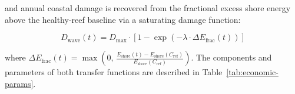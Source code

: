 \documentclass[10pt,letterpaper]{article}
\begin{document}
\noindent and annual coastal damage is recovered from the fractional excess shore energy above the healthy-reef baseline via a saturating damage function:

\begin{equation}
D_{\text{wave}}(t) = D_{\max} \cdot \left[1 - \exp\!\left(-\lambda \cdot \Delta E_{\text{frac}}(t)\right)\right]
\end{equation}

\noindent where $\Delta E_{\text{frac}}(t) = \max\!\left(0,\, \frac{E_{\text{shore}}(t) - E_{\text{shore}}(C_{\text{ref}})}{E_{\text{shore}}(C_{\text{ref}})}\right)$. The components and parameters of both transfer functions are described in Table~\ref{tab:economic-params}.

\begingroup
{}
\renewcommand{\arraystretch}{1.1}
\end{document}
